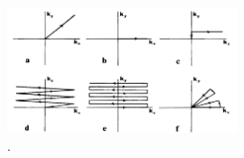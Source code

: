 \begin{figure}[!ht]
	\centering
	\includegraphics[width=0.6\textwidth, clip=true]{./Chapters/01_Introduction/Images/Kspace}
	\caption{ \cite{Ljunggren1983}. }
	\label{fig:kspace}
\end{figure}